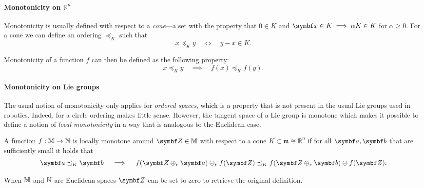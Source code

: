 \paragraph{Monotonicity on $\mathbb{R}^n$} Monotonicity is usually defined with respect to a \emph{cone}---a set with the property that $0 \in K$ and $\x \in K \implies \alpha K \in K$ for $\alpha \geq 0$. For a cone we can define an ordering $\preceq_K$ such that
\begin{equation}
  x \preceq_K y \quad \Longleftrightarrow \quad y - x \in K.
\end{equation}

Monotonicity of a function $f$ can then be defined as the following property:
\begin{equation}
  x \preceq_K y  \quad \implies \quad f(x) \preceq_K f(y).
\end{equation}

\paragraph{Monotonicity on Lie groups}
The usual notion of monotonicity only applies for \emph{ordered spaces}, which is a property that is not present in the usual Lie groups used in robotics. Indeed, for a circle ordering makes little sense.  However, the tangent space of a Lie group is monotone which makes it possible to define a notion of \emph{local monotonicity} in a way that is analogous to the Euclidean case.

\begin{definition}
  \label{def:monotonicity}
  A function $f : \mathbb{M} \rightarrow \mathbb{N}$ is locally monotone around $\Z \in \M$ with respect to a cone $K \subset \mathfrak m \cong \mathbb{R}^n$ if for all $\a, \b$ that are sufficiently small it holds that
  \begin{equation}
    \a \preceq_K \b \quad \implies \quad f(\Z \oplus_r \a) \ominus_r f(\Z) \preceq_K f(\Z \oplus_r \b) \ominus f(\Z).
  \end{equation}
\end{definition}
When $\mathbb{M}$ and $\mathbb{N}$ are Euclidean spaces $\Z$ can be set to zero to retrieve the original definition.

